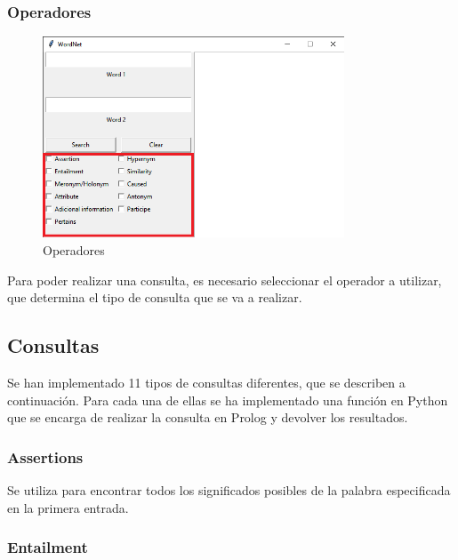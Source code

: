 \documentclass[12pt]{article}
\begin{document}
\newpage

\subsubsection{Operadores}


\begin{figure}[h]
    \centering
    \includegraphics[width=0.8\textwidth]{operators.png}
    \caption{Operadores}
    \label{fig:operators}
\end{figure}

Para poder realizar una consulta, es necesario seleccionar el operador a utilizar, que determina el tipo de consulta que se va a realizar.



\subsection{Consultas}
\label{sec:consultas}

Se han implementado 11 tipos de consultas diferentes, que se describen a continuación. Para cada una de ellas se ha implementado una función en Python que se encarga de realizar la consulta en Prolog y devolver los resultados.

\subsubsection{Assertions}

Se utiliza para encontrar todos los significados posibles de la palabra especificada en la primera entrada.

\subsubsection{Entailment}
\end{document}
